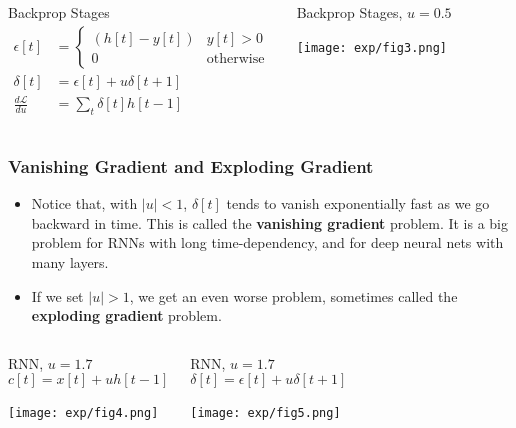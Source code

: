 \documentclass{beamer}
\begin{document}
\begin{frame}
  \begin{columns}
    \column{2.2in}
    \begin{block}{Backprop Stages}
      \begin{align*}
        \epsilon[t] &=
        \left\{\begin{array}{ll} (h[t]-y[t]) & y[t]>0\\0&\mbox{otherwise}\end{array}\right.\\
        \delta[t] &= \epsilon[t]+u\delta[t+1]\\
        \frac{d{\mathcal L}}{du}&=\sum_t \delta[t]h[t-1]
      \end{align*}
    \end{block}
    \column{2.5in}
    \begin{block}{Backprop Stages, $u=0.5$}
      \centerline{\texttt{[image: exp/fig3.png]}}
    \end{block}
    \end{columns}
\end{frame}

\begin{frame}
  \frametitle{Vanishing Gradient and Exploding Gradient}
  \begin{itemize}
    \item Notice that, with $|u|<1$, $\delta[t]$ tends to vanish
      exponentially fast as we go backward in time.  This is called
      the {\bf vanishing gradient} problem.  It is a big problem for
      RNNs with long time-dependency, and for deep neural nets with
      many layers.
    \item If we set $|u|>1$, we get an even worse problem, sometimes
      called the {\bf exploding gradient} problem.
  \end{itemize}
\end{frame}
        
\begin{frame}
  \begin{columns}
    \column{2.25in}
    \begin{block}{RNN, $u=1.7$}
      \[
      c[t] = x[t]+uh[t-1]
      \]
      \centerline{\texttt{[image: exp/fig4.png]}}
    \end{block}
    \column{2.25in}
    \begin{block}{RNN, $u=1.7$}
      \[
      \delta[t]=\epsilon[t]+u\delta[t+1]
      \]
      \centerline{\texttt{[image: exp/fig5.png]}}
    \end{block}
    \end{columns}
\end{frame}
\end{document}

